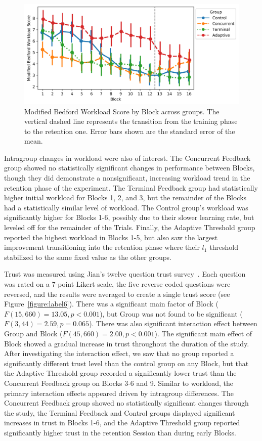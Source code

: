 \begin{figure}[bt!]
	\centering
	\includegraphics[height=.4\textwidth]{figures/EMG/ModifiedBedfordWorkloadScore}
	\caption[Modified Bedford Workload Score by Block across groups]{Modified Bedford Workload Score by Block across groups.
		The vertical dashed line represents the transition from the training phase to the retention one.
		Error bars shown are the standard error of the mean.}
	\label{figure:label5}
\end{figure}

Intragroup changes in workload were also of interest.
The Concurrent Feedback group showed no statistically significant changes in performance between Blocks, though they did demonstrate a nonsignificant, increasing workload trend in the retention phase of the experiment.
The Terminal Feedback group had statistically higher initial workload for Blocks 1, 2, and 3, but the remainder of the Blocks had a statistically similar level of workload.
The Control group's workload was significantly higher for Blocks 1-6, possibly due to their slower learning rate, but leveled off for the remainder of the Trials.
Finally, the Adaptive Threshold group reported the highest workload in Blocks 1-5, but also saw the largest improvement transitioning into the retention phase where their $l_1$ threshold stabilized to the same fixed value as the other groups.

Trust was measured using Jian's twelve question trust survey~\citep{jian_foundations_2000}.
Each question was rated on a 7-point Likert scale, the five reverse coded questions were reversed, and the results were averaged to create a single trust score (see Figure~\ref{figure:label6}).
There was a significant main factor of Block ($F(15, 660) = 13.05, p < 0.001$), but Group was not found to be significant ($F(3, 44) = 2.59, p = 0.065$).
There was also significant interaction effect between Group and Block ($F(45, 660) = 2.00, p < 0.001$).
The significant main effect of Block showed a gradual increase in trust throughout the duration of the study.
After investigating the interaction effect, we saw that no group reported a significantly different trust level than the control group on any Block, but that the Adaptive Threshold group recorded a significantly lower trust than the Concurrent Feedback group on Blocks 3-6 and 9.
Similar to workload, the primary interaction effects appeared driven by intragroup differences.
The Concurrent Feedback group showed no statistically significant changes through the study, the Terminal Feedback and Control groups displayed significant increases in trust in Blocks 1-6, and the Adaptive Threshold group reported significantly higher trust in the retention Session than during early Blocks.

